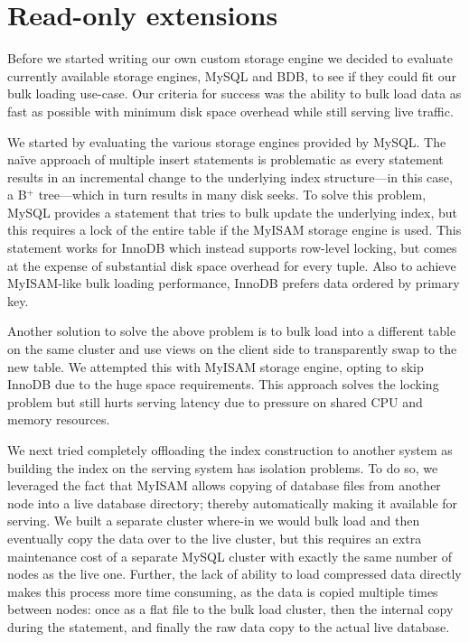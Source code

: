 
\section{Read-only extensions}
\label{sec:read_only}

Before we started writing our own custom storage engine we decided to
evaluate currently available storage engines, MySQL and BDB, to see 
if they could fit our bulk loading use-case. Our criteria for success 
was the ability to bulk load data as fast as possible with minimum 
disk space overhead while still serving live traffic.
 
We started by evaluating the various storage engines provided by
MySQL. The na\"ive approach of multiple insert statements is
problematic as every statement results in an incremental change to the
underlying index structure---in this case, a B$^{+}$ tree---which in
turn results in many disk seeks. To solve this problem, MySQL provides
a  statement that tries to bulk update the underlying
index, but this requires a lock of the entire table if the MyISAM
storage engine is used. This statement works for InnoDB which instead
supports row-level locking, but comes at the expense of substantial 
disk space overhead for every tuple. Also to achieve MyISAM-like bulk 
loading performance, InnoDB prefers data ordered by primary key.

Another solution to solve the above problem is to bulk load into a 
different table on the same cluster and use views on the client side to 
transparently swap to the new table. We attempted this with MyISAM 
storage engine, opting to skip InnoDB due to the huge space requirements.
This approach solves the locking problem but still hurts serving 
latency due to pressure on shared CPU and memory resources.  

We next tried completely offloading the index construction to another
system as building the index on the serving system has isolation
problems. To do so, we leveraged the fact that MyISAM allows copying 
of database files from another node into a live database directory; 
thereby automatically making it available for serving. 
We built a separate cluster where-in we would bulk load and then eventually 
copy the data over to the live cluster, but this requires an extra 
maintenance cost of a separate MySQL cluster with exactly the same number 
of nodes as the live one. Further, the lack of ability to load compressed 
data directly makes this process more time consuming, as the data is copied 
multiple times between nodes: once as a flat file to the bulk load cluster, 
then the internal copy during the  statement, and finally the 
raw data copy to the actual live database. 

